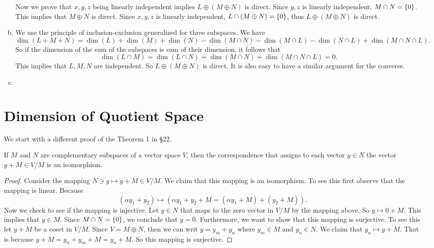 \begin{problem}
\begin{solution}
\begin{enumerate}[(a)]
			Now we prove that $ x,y,z $ being linearly independent implies $ L\oplus(M\oplus N)$ is direct. Since $ y,z $ is linearly independent, $ M\cap N  = \{0\}$. This implies that $ M\oplus N $ is direct. Since $ x,y,z $ is linearly independent, $ L\cap (M\oplus N) = \{0\} $, thus $ L\oplus(M\oplus N) $ is direct.
			
			
			\item We use the principle of inclusion-exclusion generalized for three subspaces. We have
			\[ \dim(L+M+N) = \dim(L) + \dim(M) + \dim(N) - \dim(M\cap N) - \dim(M\cap L) - \dim(N\cap L) + \dim (M\cap N\cap L). \]
			So if the dimension of the sum of the subspaces is sum of their dimension, it follows that 
			\[ \dim(L\cap M) = \dim (L\cap N) = \dim(M\cap N) = \dim (M\cap N\cap L) = 0. \]
			This implies that $ L,M,N $ are independent. So $ L\oplus(M\oplus N) $ is direct. It is also easy to have a similar argument for the converse.
			
			\item
		\end{enumerate}
	\end{solution}
\end{problem}



\section{Dimension of Quotient Space}
We start with a different proof of the Theorem 1 in \S22.
\begin{theorem}
	If $ M $ and $ N $ are complementary subspaces of a vector space $ V $, then the correspondence that assigns to each vector $ y\in N $ the vector $ y+M \in V/M $ is an isomorphism.
\end{theorem}
\begin{proof}
	Consider the mapping $ N \ni y \mapsto y+M \in V/M $. We claim that this mapping is an isomorphism. To see this first observe that the mapping is linear. Because
	\[ (\alpha y_1 +y_2) \mapsto (\alpha y_1 + y_2 + M = (\alpha y_1 + M) + (y_2 + M)). \]
	Now we check to see if the mapping is injective. Let $ y \in N $ that maps to the zero vector in $ V/M $ by the mapping above. So $ y\mapsto 0 + M $. This implies that $ y \in M $. Since $ M\cap N = \{0\} $, we conclude that $ y = 0 $. Furthermore, we want to show that this mapping is surjective. To see this let $ y+M $ be a coset in $ V/M $. Since $ V = M\oplus N $, then we can writ $ y = y_m + y_n $ where $ y_m \in M $ and $ y_n\in N $. We claim that $ y_n \mapsto y+M $. That is because $ y+M = y_n + y_m +M = y_n + M $. So this mapping is surjective.
\end{proof}


